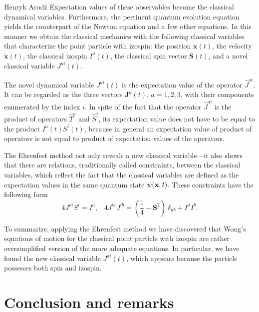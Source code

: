 \begin{artengenv}{Henryk Arod\'z}
Expectation values of these observables become the classical dynamical variables. Furthermore, the pertinent quantum evolution equation yields the counterpart of the Newton equation and a few other equations. In this manner we obtain the classical mechanics with the following classical variables that characterize the point particle with izospin: the position $\mathbf{x}(t)$, the velocity $\dot{\mathbf{x}}(t)$, the classical izospin $I^a(t)$, the classical spin vector $\mathbf{S}(t)$, and a novel classical variable 
 $ J^{ai}(t)$. 
 
The novel dynamical variable $J^{ai}(t)$ is the expectation value of the operator $\hat{J}^{ai} $. It can be regarded as the three vectors $\mathbf{J}^a(t)$, \mbox{$a=1,2,3$}, with their components enumerated by the index $i$. In spite of the fact that the operator $\hat{J}^{ai}$ is the product of operators 
$\hat{T}^a$ and $\hat{S}^i$, its expectation value does not have to be equal to the product $I^a(t) S^i(t)$, because in general an expectation value of product of operators is not equal to product of expectation values of the operators. 

The Ehrenfest method not only reveals a new classical variable---it also shows that there are relations, traditionally called constraints, between the classical variables, which reflect the fact that the classical variables are defined as the expectation values in the same quantum state $\psi({\bf x}, t).$ These constraints have the following form
\[ 4 J^{i a} S^i = I^a, \;\;\; 4 J^{ia} J^{ib} = (\frac{1}{4} - \mathbf{S}^2) \: \delta_{ab} + I^a I^b. \]




To summarize, applying the Ehrenfest method we have discovered that Wong's equations of motion for the classical point particle with izospin are rather oversimplified version of the more adequate equations. In particular, we have found the new classical variable $J^{ai}(t)$, which appears because the particle possesses both spin and izospin. 








\section{Conclusion and remarks} 


\end{artengenv}
